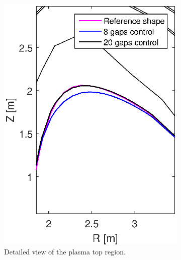 \begin{figure}[h]
\begin{subfigure}[b]{0.32\textwidth}
		\includegraphics[width=\textwidth]{Chp3/zoom_Ref_20gaps_8gaps_minor_top_2.eps} 
		\caption{Detailed view of the plasma top region.\label{figure:minor_top}}
	\end{subfigure}
	~
	\begin{subfigure}[b]{0.32\textwidth}

\end{subfigure}
\end{figure}
